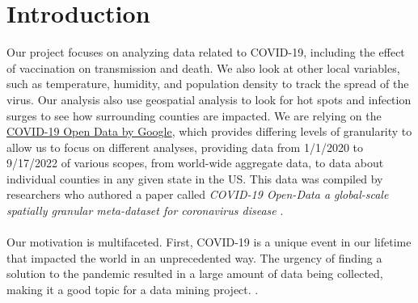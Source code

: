 \documentclass[sigconf,screen,nonacm]{acmart}
\begin{document}
\maketitle

\section{Introduction}
Our project focuses on analyzing data related to COVID-19, including the effect of vaccination on transmission and death. We also look at other local variables, such as temperature, humidity, and population density to track the spread of the virus. Our analysis also use geospatial analysis to look for hot spots and infection surges to see how surrounding counties are impacted. We are relying on the \href{https://health.google.com/covid-19/open-data/}{COVID-19 Open Data by Google}, which provides differing levels of granularity to allow us to focus on different analyses, providing data from 1/1/2020 to 9/17/2022 of various scopes, from world-wide aggregate data, to data about individual counties in any given state in the US. This data was compiled by researchers who authored a paper called \textit{COVID-19 Open-Data a global-scale spatially granular meta-dataset for coronavirus disease} \cite{wahltinez2022covid}.\\ \\
Our motivation is multifaceted. First, COVID-19 is a unique event in our lifetime that impacted the world in an unprecedented way. The urgency of finding a solution to the pandemic resulted in a large amount of data being collected, making it a good topic for a data mining project. 
\cite{wahltinez2022covid}. \\
\end{document}
